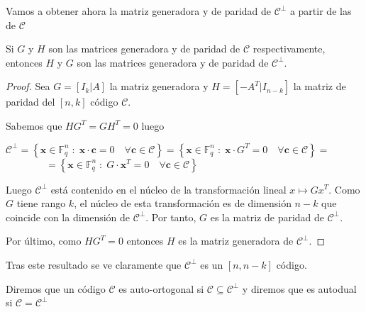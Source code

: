 Vamos a obtener ahora la matriz generadora y de paridad de $\mathcal{C}^\perp$ a partir de las de $\mathcal{C}$

\begin{proposition}
Si $G$ y $H$ son las matrices generadora y de paridad de $\mathcal{C}$ respectivamente, entonces $H$ y $G$ son las matrices generadora y de paridad de $\mathcal{C}^\perp$.
\end{proposition}

\begin{proof}
Sea $G = \left[I_k | A\right]$ la  matriz generadora y $H = \left[-A^T |I_{n-k}\right]$ la matriz de paridad del $\left[n,k\right]$ código $\mathcal{C}$. 

Sabemos que $HG^T = GH^T = 0$ luego

$\mathcal{C}^\perp = \left\{ \textbf{x} \in \mathbb{F}_q^n \; : \; \textbf{x} \cdot \textbf{c} = 0 \quad  \forall \textbf{c} \in \mathcal{C} \right\} = \left\{ \textbf{x} \in \mathbb{F}_q^n \; : \; \textbf{x} \cdot G^T = 0 \quad  \forall \textbf{c} \in \mathcal{C} \right\} = $ \\
 $\qquad \qquad = \left\{ \textbf{x} \in \mathbb{F}_q^n \; : \; G \cdot \textbf{x}^T = 0 \quad  \forall \textbf{c} \in \mathcal{C} \right\}$
 
Luego $\mathcal{C}^\perp$ está contenido en el núcleo de la transformación lineal $x \mapsto Gx^T$. Como $G$ tiene rango $k$, el núcleo de esta transformación es de dimensión $n-k$ que coincide con la dimensión de $\mathcal{C}^\perp$. Por tanto, $G$ es la matriz de paridad de $\mathcal{C}^\perp$.

Por último, como $HG^T = 0$ entonces $H$ es la matriz generadora de $\mathcal{C}^\perp$.
\end{proof}

Tras este resultado se ve claramente que $\mathcal{C}^\perp$ es un $\left[n,n-k\right]$ código.

\begin{definition}
Diremos que un código $\mathcal{C}$ es auto-ortogonal si $\mathcal{C} \subseteq \mathcal{C}^\perp$ y diremos que es autodual si $\mathcal{C} = \mathcal{C}^\perp$

\end{definition}

